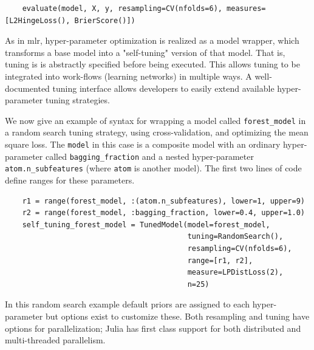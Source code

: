 \documentclass{article}
\begin{document}
\begin{verbatim}
    evaluate(model, X, y, resampling=CV(nfolds=6), measures=[L2HingeLoss(), BrierScore()])
\end{verbatim}


As in mlr, hyper-parameter optimization is realized as a model wrapper, which transforms a base model into a "self-tuning" version of that model. That is, tuning is is abstractly specified before being executed. This allows tuning to be integrated into work-flows (learning networks) in multiple ways. A well-documented tuning interface \cite{MLJTuning} allows developers to easily extend available hyper-parameter tuning strategies.

We now give an example of syntax for wrapping a model called \texttt{forest\_model} in a random search tuning strategy, using cross-validation, and optimizing the mean square loss. The \texttt{model} in this case is a composite model with an ordinary hyper-parameter called \texttt{bagging\_fraction} and a nested hyper-parameter \texttt{atom.n\_subfeatures} (where \texttt{atom} is another model). The first two lines of code define ranges for these parameters.

\begin{verbatim}
    r1 = range(forest_model, :(atom.n_subfeatures), lower=1, upper=9)
    r2 = range(forest_model, :bagging_fraction, lower=0.4, upper=1.0)
    self_tuning_forest_model = TunedModel(model=forest_model,
                                          tuning=RandomSearch(),
                                          resampling=CV(nfolds=6),
                                          range=[r1, r2],
                                          measure=LPDistLoss(2),
                                          n=25)
\end{verbatim}

In this random search example default priors are assigned to each hyper-parameter but options exist to customize these. Both resampling and tuning have options for parallelization; Julia has first class support for both distributed and multi-threaded parallelism.
\end{document}
